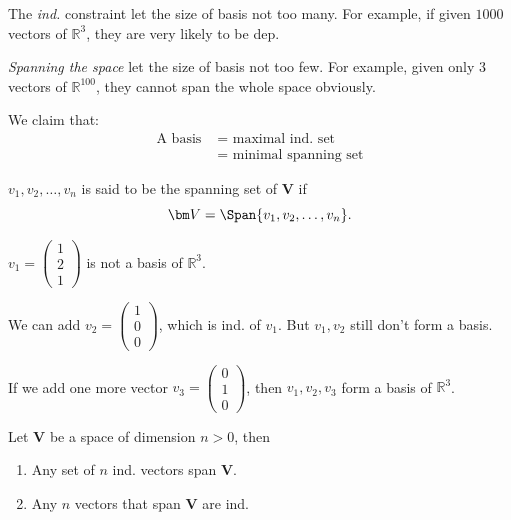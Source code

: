 The \emph{ind.} constraint let the size of basis not too many. For example, if given $1000$ vectors of $\mathbb{R}^{3}$, they are very likely to be dep.

\emph{Spanning the space} let the size of basis not too few. For example, given only $3$ vectors of $\mathbb{R}^{100}$, they cannot span the whole space obviously.

We claim that: 
\begin{align*}
\text{A basis }&=\text{ maximal ind. set}\\
&=\text{ minimal spanning set}
\end{align*}
\begin{definition}
$v_1,v_2,\dots,v_n$ is said to be the spanning set of $\bm V$ if 
\[
\bm V = \Span\{v_1,v_2,\dots,v_n\}.
\]
\end{definition}
\begin{example}
$v_1 = \begin{pmatrix}
1\\2\\1
\end{pmatrix}$ is not a basis of $\mathbb{R}^{3}$.

We can add $v_2 = \begin{pmatrix}
1\\0\\0
\end{pmatrix}$, which is ind. of $v_1$. But $v_1,v_2$ still don't form a basis.

If we add one more vector $v_3 = \begin{pmatrix}
0\\1\\0
\end{pmatrix}$, then $v_1,v_2,v_3$ form a basis of $\mathbb{R}^{3}$.
\end{example}

\begin{theorem}\label{theorem_3.3}
Let $\bm V$ be a space of dimension $n>0$, then
\begin{enumerate}
\item
Any set of $n$ ind. vectors span $\bm V$.
\item
Any $n$ vectors that span $\bm V$ are ind.
\end{enumerate}
\end{theorem}

